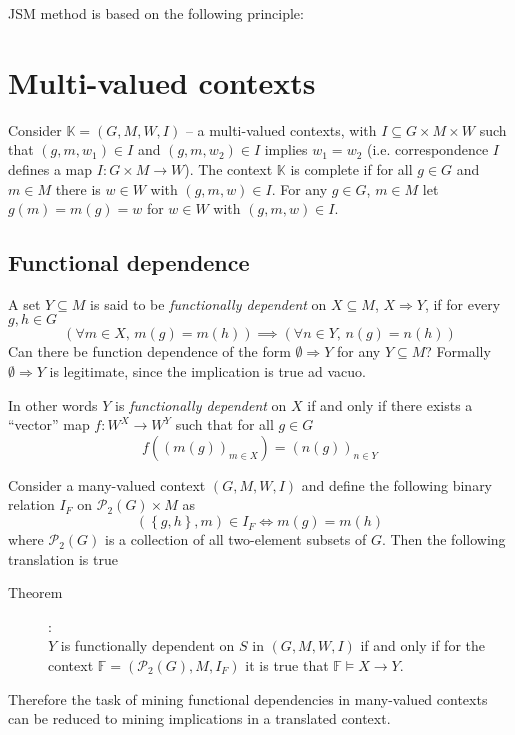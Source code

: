 \documentclass[a4paper]{article}
\newcommand{\obj}[1]{{\left\{ #1 \right \}}}
\newcommand{\brac}[1]{{\left ( #1 \right )}}
\newcommand{\Pwr}{\mathcal{P}}
\newcommand{\Ctx}{\mathbb{K}}
\begin{document}
JSM method is based on the following principle: %





\section{Multi-valued contexts} %
\label{sec:multi_valued_contexts}

Consider $\Ctx=\brac{G,M,W,I}$ -- a multi-valued contexts, with $I\subseteq G\times M\times W$ such that $(g,m,w_1)\in I$ and $(g,m,w_2)\in I$ implies $w_1=w_2$ (i.e. correspondence $I$ defines a map $I:G\times M\to W$). The context $\Ctx$ is complete if for all $g\in G$ and $m\in M$ there is $w\in W$ with $(g,m,w)\in I$. For any $g\in G$, $m\in M$ let $g(m)=m(g)=w$ for $w\in W$ with $(g,m,w)\in I$.

\subsection{Functional dependence} %
\label{sub:functional_dependence}
A set $Y\subseteq M$ is said to be \emph{functionally dependent} on $X\subseteq M$, $X\Rightarrow Y$, if for every $g,h\in G$ \[ \brac{ \forall m\in X,\,m(g)=m(h) } \implies \brac{ \forall n\in Y,\,n(g)=n(h) } \]
Can there be function dependence of the form $\emptyset \Rightarrow Y$ for any $Y\subseteq M$? Formally $\emptyset \Rightarrow Y$ is legitimate, since the implication is true ad vacuo.

In other words $Y$ is \emph{functionally dependent} on $X$ if and only if there exists a ``vector'' map $f: W^X\to W^Y$ such that for all $g\in G$ \[f\brac{\brac{m(g)}_{m\in X}} = \brac{n(g)}_{n\in Y}\] 

Consider a many-valued context $\brac{G,M,W,I}$ and define the following binary relation $I_F$ on $\Pwr_2{(G)}\times M$ as \[\brac{\obj{g,h},m}\in I_F \Leftrightarrow m(g)=m(h)\] where $\Pwr_2{(G)}$ is a collection of all two-element subsets of $G$. Then the following translation is true \begin{description}
	\item[Theorem]:\hfill \\
	$Y$ is functionally dependent on $S$ in $\brac{G,M,W,I}$ if and only if for the context $\mathbb{F} = \brac{\Pwr_2{(G)}, M, I_F}$ it is true that $\mathbb{F}\models X\to Y$.
\end{description}
Therefore the task of mining functional dependencies in many-valued contexts can be reduced to mining implications in a translated context.
\end{document}
